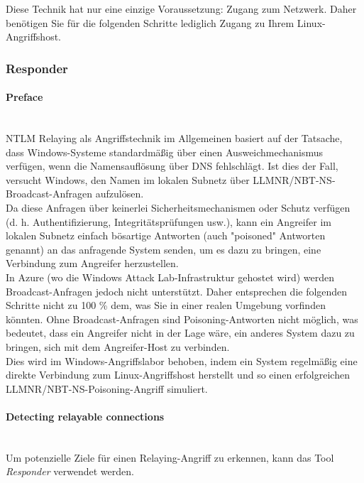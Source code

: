 Diese Technik hat nur eine einzige Voraussetzung: Zugang zum Netzwerk. Daher benötigen Sie für die folgenden Schritte lediglich Zugang zu Ihrem Linux-Angriffshost.

\subsubsection{Responder}

\paragraph{Preface}\mbox{} \\
NTLM Relaying als Angriffstechnik im Allgemeinen basiert auf der Tatsache, dass Windows-Systeme standardmäßig über einen Ausweichmechanismus verfügen, wenn die Namensauflösung über DNS fehlschlägt. Ist dies der Fall, versucht Windows, den Namen im lokalen Subnetz über LLMNR/NBT-NS-Broadcast-Anfragen aufzulösen.\\

Da diese Anfragen über keinerlei Sicherheitsmechanismen oder Schutz verfügen (d. h. Authentifizierung, Integritätsprüfungen usw.), kann ein Angreifer im lokalen Subnetz einfach bösartige Antworten (auch "poisoned" Antworten genannt) an das anfragende System senden, um es dazu zu bringen, eine Verbindung zum Angreifer herzustellen.\\

In Azure (wo die Windows Attack Lab-Infrastruktur gehostet wird) werden Broadcast-Anfragen jedoch nicht unterstützt. Daher entsprechen die folgenden Schritte nicht zu 100 \% dem, was Sie in einer realen Umgebung vorfinden könnten. Ohne Broadcast-Anfragen sind Poisoning-Antworten nicht möglich, was bedeutet, dass ein Angreifer nicht in der Lage wäre, ein anderes System dazu zu bringen, sich mit dem Angreifer-Host zu verbinden.\\

Dies wird im Windows-Angriffslabor behoben, indem ein System regelmäßig eine direkte Verbindung zum Linux-Angriffshost herstellt und so einen erfolgreichen LLMNR/NBT-NS-Poisoning-Angriff simuliert.

\paragraph{Detecting relayable connections}\mbox{} \\
Um potenzielle Ziele für einen Relaying-Angriff zu erkennen, kann das Tool \textcolor{OSTPink}{\textit{Responder}} verwendet werden.

